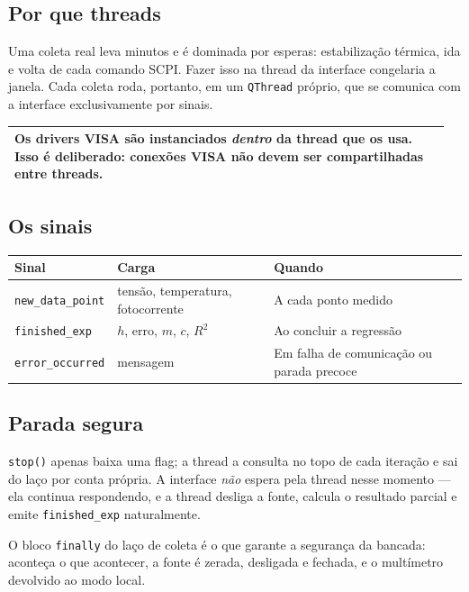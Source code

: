 \documentclass[11pt,a4paper]{article}
\newcommand{\classe}[1]{\texttt{#1}}
\newenvironment{nota}
  {\par\medskip\noindent\begin{tabular}{|p{0.96\linewidth}|}\hline\rule{0pt}{3ex}}
  {\\[1ex]\hline\end{tabular}\par\medskip}
\begin{document}
\subsection{Por que threads}

Uma coleta real leva minutos e é dominada por esperas: estabilização térmica,
ida e volta de cada comando SCPI. Fazer isso na thread da interface congelaria
a janela. Cada coleta roda, portanto, em um \classe{QThread} próprio, que se
comunica com a interface exclusivamente por sinais.

\begin{nota}
Os drivers VISA são instanciados \emph{dentro} da thread que os usa. Isso é
deliberado: conexões VISA não devem ser compartilhadas entre threads.
\end{nota}

\subsection{Os sinais}

\begin{center}
\begin{tabular}{@{}p{3.4cm}p{4.0cm}p{7.0cm}@{}}
\toprule
\textbf{Sinal} & \textbf{Carga} & \textbf{Quando} \\
\midrule
\texttt{new\_data\_point} & tensão, temperatura, fotocorrente & A cada ponto medido \\[0.3em]
\texttt{finished\_exp} & $h$, erro, $m$, $c$, $R^2$ & Ao concluir a regressão \\[0.3em]
\texttt{error\_occurred} & mensagem & Em falha de comunicação ou parada precoce \\
\bottomrule
\end{tabular}
\end{center}

\subsection{Parada segura}

\texttt{stop()} apenas baixa uma flag; a thread a consulta no topo de cada
iteração e sai do laço por conta própria. A interface \emph{não} espera pela
thread nesse momento --- ela continua respondendo, e a thread desliga a fonte,
calcula o resultado parcial e emite \texttt{finished\_exp} naturalmente.

O bloco \texttt{finally} do laço de coleta é o que garante a segurança da
bancada: aconteça o que acontecer, a fonte é zerada, desligada e fechada, e o
multímetro devolvido ao modo local.
\end{document}
